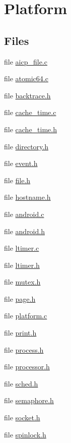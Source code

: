 \hypertarget{group__platform}{\section{Platform}
\label{group__platform}
}
\subsection*{Files}
\begin{DoxyCompactItemize}
\item 
file \hyperlink{aicp__file_8c}{aicp\-\_\-file.\-c}
\item 
file \hyperlink{atomic64_8c}{atomic64.\-c}
\item 
file \hyperlink{backtrace_8h}{backtrace.\-h}
\item 
file \hyperlink{cache__time_8c}{cache\-\_\-time.\-c}
\item 
file \hyperlink{cache__time_8h}{cache\-\_\-time.\-h}
\item 
file \hyperlink{directory_8h}{directory.\-h}
\item 
file \hyperlink{event_8h}{event.\-h}
\item 
file \hyperlink{file_8h}{file.\-h}
\item 
file \hyperlink{hostname_8h}{hostname.\-h}
\item 
file \hyperlink{android_8c}{android.\-c}
\item 
file \hyperlink{android_8h}{android.\-h}
\item 
file \hyperlink{ltimer_8c}{ltimer.\-c}
\item 
file \hyperlink{ltimer_8h}{ltimer.\-h}
\item 
file \hyperlink{mutex_8h}{mutex.\-h}
\item 
file \hyperlink{page_8h}{page.\-h}
\item 
file \hyperlink{platform_8c}{platform.\-c}
\item 
file \hyperlink{print_8h}{print.\-h}
\item 
file \hyperlink{process_8h}{process.\-h}
\item 
file \hyperlink{processor_8h}{processor.\-h}
\item 
file \hyperlink{sched_8h}{sched.\-h}
\item 
file \hyperlink{semaphore_8h}{semaphore.\-h}
\item 
file \hyperlink{socket_8h}{socket.\-h}
\item 
file \hyperlink{spinlock_8h}{spinlock.\-h}
\item 

\end{DoxyCompactItemize}
